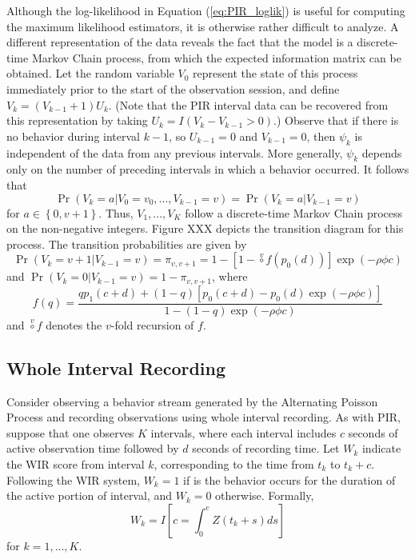 \documentclass[man, noextraspace, floatsintext]{apa6}\usepackage[]{graphicx}\usepackage[]{color}
\begin{document}
Although the log-likelihood in Equation (\ref{eq:PIR_loglik}) is useful for computing the maximum likelihood estimators, it is otherwise rather difficult to analyze. 
A different representation of the data reveals the fact that the model is a discrete-time Markov Chain process, from which the expected information matrix can be obtained. 
Let the random variable $V_0$ represent the state of this process immediately prior to the start of the observation session, and define $V_k = \left(V_{k-1} + 1\right) U_k$. 
(Note that the PIR interval data can be recovered from this representation by taking $U_k = I(V_k - V_{k-1} > 0)$.) 
Observe that if there is no behavior during interval $k-1$, so $U_{k-1} = 0$ and $V_{k-1} = 0$, then $\psi_k$ is independent of the data from any previous intervals. 
More generally, $\psi_k$ depends only on the number of preceding intervals in which a behavior occurred.
It follows that 
\[
\Pr\left(V_k = a | V_0 = v_0,...,V_{k-1} = v\right) = \Pr\left(V_k = a | V_{k-1} = v\right) \]
for $a \in \left\{ 0, v + 1 \right\}$. 
Thus, $V_1,...,V_{K}$ follow a discrete-time Markov Chain process on the non-negative integers. 
Figure XXX depicts the transition diagram for this process.
The transition probabilities are given by 
\[ \Pr\left(V_k = v + 1 | V_{k-1} = v\right) = \pi_{v,v+1} = 1 - \left[1 - \stackrel{v}{\circ} f\left(p_0(d)\right)\right] \exp\left(- \rho \phi c\right) \]
and $\Pr\left(V_k = 0 | V_{k-1} = v\right) = 1 - \pi_{v,v+1}$, 
where \[
f(q) = \frac{q p_1(c + d) + (1 - q)\left[p_0(c + d) - p_0(d)\exp(-\rho\phi c)\right]}{1 - (1 - q)\exp(-\rho \phi c)} \]
and $\stackrel{v}{\circ} f$ denotes the $v$-fold recursion of $f$.


\subsection{Whole Interval Recording}
\label{sec:WIR}

Consider observing a behavior stream generated by the Alternating Poisson Process and recording observations using whole interval recording. 
As with PIR, suppose that one observes $K$ intervals, where each interval includes $c$ seconds of active observation time followed by $d$ seconds of recording time. 
Let $W_k$ indicate the WIR score from interval $k$, corresponding to the time from $t_k$ to $t_k + c$. 
Following the WIR system, $W_k = 1$ if is the behavior occurs for the duration of the active portion of interval, and $W_k = 0$ otherwise. 
Formally, 
\begin{equation}
W_k = I\left[ c = \int_0^c Z\left(t_k + s \right) ds\right]
\end{equation}
for $k = 1,...,K$. 
\end{document}
